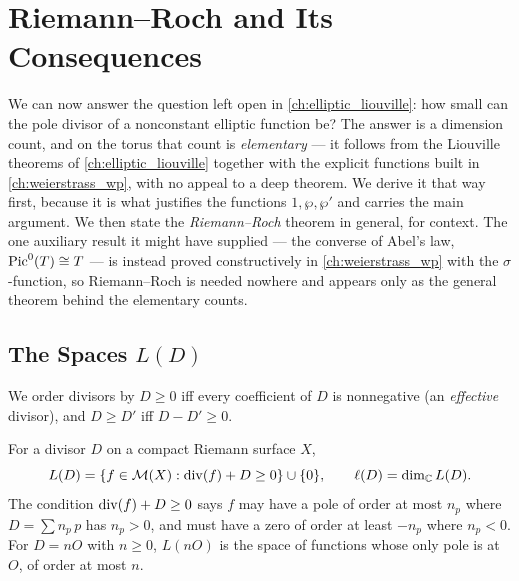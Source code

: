 \chapter{Riemann--Roch and Its Consequences}
\label{ch:riemann_roch}

We can now answer the question left open in \cref{ch:elliptic_liouville}: how
small can the pole divisor of a nonconstant elliptic function be? The answer is a
dimension count, and on the torus that count is \emph{elementary} --- it follows
from the Liouville theorems of \cref{ch:elliptic_liouville} together with the
explicit functions built in \cref{ch:weierstrass_wp}, with no appeal to a deep
theorem. We derive it that way first, because it is what justifies the functions
\(1, \wp, \wp'\) and carries the main argument. We then state the
\emph{Riemann--Roch} theorem in general, for context. The one auxiliary result it
might have supplied --- the converse of Abel's law, \(\operatorname{Pic}^0(T) \cong T\) --- is
instead proved constructively in \cref{ch:weierstrass_wp} with the
\(\sigma\)-function, so Riemann--Roch is needed nowhere and appears only as the
general theorem behind the elementary counts.

\section{The Spaces \texorpdfstring{$L(D)$}{L(D)}}
\label{sec:rr-spaces}

We order divisors by \(D \ge 0\) iff every coefficient of \(D\) is
nonnegative (an \emph{effective} divisor), and \(D \ge D'\) iff \(D - D' \ge 0\).

\begin{definition}
\label{def:rr-LD}
For a divisor \(D\) on a compact Riemann surface \(X\),
\[
  L(D) = \{ f \in \mathcal{M}(X) : \operatorname{div}(f) + D \ge 0 \} \cup \{0\},
  \qquad \ell(D) = \dim_{\mathbb{C}} L(D) .
\]
The condition \(\operatorname{div}(f) + D \ge 0\) says \(f\) may have a pole of order at
most \(n_p\) where \(D = \sum n_p\,p\) has \(n_p > 0\), and must have a zero of
order at least \(-n_p\) where \(n_p < 0\). For \(D = nO\) with \(n \ge 0\),
\(L(nO)\) is the space of functions whose only pole is at \(O\), of order at most
\(n\).
\end{definition}

